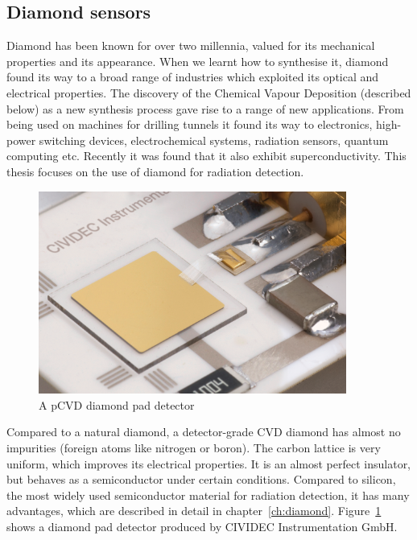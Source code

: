 \subsection{Diamond sensors}
Diamond has been known for over two millennia, valued for its mechanical properties and its appearance. When we learnt how to synthesise it, diamond found its way to a broad range of industries which exploited its optical and electrical properties. The discovery of the Chemical Vapour Deposition (described below) as a new synthesis process gave rise to a range of new applications. From being used on machines for drilling tunnels it found its way to electronics, high-power switching devices, electrochemical systems, radiation sensors, quantum computing etc. Recently it was found that it also exhibit superconductivity. This thesis focuses on the use of diamond for radiation detection.
\begin{figure}[!t]
\centering
\includegraphics[width=0.9\textwidth]{01_introduction/pics/cividecpcvd}
\caption{A pCVD diamond pad detector \cite{Cividec:00000}}
\label{fig:cividecpcvd}
\end{figure}
Compared to a natural diamond, a detector-grade CVD diamond has almost no impurities (foreign atoms like nitrogen or boron). The carbon lattice is very uniform, which improves its electrical properties. It is an almost perfect insulator, but behaves as a semiconductor under certain conditions. Compared to silicon, the most widely used semiconductor material for radiation detection, it has many advantages, which are described in detail in chapter~\ref{ch:diamond}. Figure~\ref{fig:cividecpcvd} shows a diamond pad detector produced by CIVIDEC Instrumentation GmbH.

